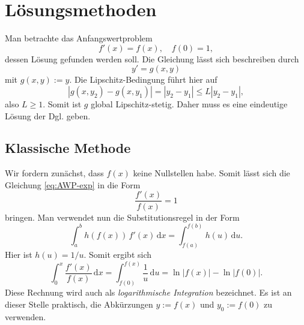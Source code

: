 \documentclass[a4paper,10pt,fleqn,twocolumn,twoside,openany]{article}
\numberwithin{equation}{section}
\theoremstyle{definition}
\begin{document}
\section{Lösungsmethoden}
Man betrachte das Anfangswertproblem
\begin{equation}\label{eq:AWP-exp}
f'(x) = f(x), \quad f(0)=1,
\end{equation}
dessen Lösung gefunden werden soll. Die Gleichung lässt sich
beschreiben durch
\begin{equation}
y' = g(x,y)
\end{equation}
mit $g(x,y):=y$. Die Lipschitz-Bedingung führt hier auf%
\begin{equation}
|g(x,y_2)-g(x,y_1)| = |y_2-y_1|\le L|y_2-y_1|,
\end{equation}
also $L\ge 1$. Somit ist $g$ global Lipschitz-stetig. Daher muss
es eine eindeutige Lösung der Dgl. geben.

\subsection{Klassische Methode}
Wir fordern zunächst, dass $f(x)$ keine Nullstellen habe. Somit
lässt sich die Gleichung \eqref{eq:AWP-exp} in die Form
\begin{equation}\label{eq:AWP-exp-Umformung}
\frac{f'(x)}{f(x)}=1
\end{equation}
bringen. Man verwendet nun die Substitutionsregel in der Form
\begin{equation}
\int_a^b h(f(x))\,f'(x)\,\mathrm dx
= \int_{f(a)}^{f(b)} h(u)\,\mathrm du.
\end{equation}
Hier ist $h(u)=1/u$. Somit ergibt sich
\begin{equation}
\int_0^x \frac{f'(x)}{f(x)}\,\mathrm dx
= \int_{f(0)}^{f(x)} \frac{1}{u}\,\mathrm du
= \ln|f(x)|-\ln|f(0)|.
\end{equation}
Diese Rechnung wird auch als \emph{logarithmische Integration}
bezeichnet. Es ist an dieser Stelle praktisch, die Abkürzungen
$y:=f(x)$ und $y_0:=f(0)$ zu verwenden.
\end{document}
